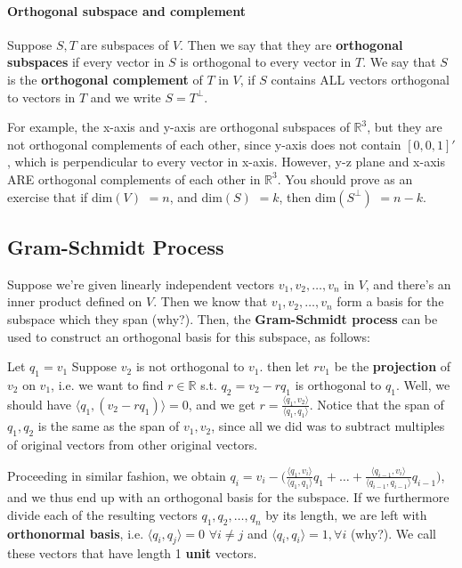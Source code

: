 \documentclass[12pt,oneside]{article}
\begin{document}
\paragraph{Orthogonal subspace and complement}
Suppose $S, T$ are subspaces of $V$. Then we say that they are \textbf{orthogonal subspaces} if every vector in $S$ is orthogonal to every vector in $T$. We say that $S$ is the \textbf{orthogonal complement} of $T$ in $V$, if $S$ contains ALL vectors orthogonal to vectors in $T$ and we write $S = T^\perp$. 

For example, the x-axis and y-axis are orthogonal subspaces of ${\mathbb{R}}^3$, but they are not orthogonal complements of each other, since y-axis does not contain $\left[ 0, 0, 1 \right]'$, which is perpendicular to every vector in x-axis. However, y-z plane and x-axis ARE orthogonal complements of each other in ${\mathbb{R}}^3$. You should prove as an exercise that if dim$(V)$ $= n$, and dim$(S)$ $=k$, then dim$(S^\perp)$ $= n-k$.

\subsection{Gram-Schmidt Process}

Suppose we're given linearly independent vectors $v_{1}, v_{2}, \ldots, v_{n}$ in $V$, and there's an inner product defined on $V$. Then we know that $v_1, v_2, \ldots, v_n$ form a basis for the subspace which they span (why?).  Then, the \textbf{Gram-Schmidt process} can be used to construct an orthogonal basis for this subspace, as follows:

Let $q_1 = v_1$ Suppose $v_2$ is not orthogonal to $v_1$. then let $r v_1$ be the \textbf{projection} of $v_2$ on $v_1$, i.e. we want to find $r \in \mathbb{R}$ s.t. $q_2 = v_2 - r q_1$ is orthogonal to $q_1$. Well, we should have $\langle q_1, (v_2 - r q_1) \rangle = 0$, and we get $r = \frac{\langle q_1, v_2 \rangle}{\langle q_1, q_1 \rangle}$. Notice that the span of $q_1, q_2$ is the same as the span of $v_1, v_2$, since all we did was to subtract multiples of original vectors from other original vectors. 

Proceeding in similar fashion, we obtain $q_i = v_i - \Big( \frac{\langle q_1, v_i \rangle}{\langle q_1, q_1 \rangle} q_1 + \ldots + \frac{\langle q_{i-1}, v_{i} \rangle}{\langle q_{i-1}, q_{i-1} \rangle} q_{i-1}\Big)$, and we thus end up with an orthogonal basis for the subspace. If we furthermore divide each of the resulting vectors $q_1, q_2, \ldots, q_n$ by its length, we are left with \textbf{orthonormal basis}, i.e. $\langle q_i, q_j \rangle = 0$ $\forall i \neq j$ and $\langle q_i, q_i \rangle = 1, \forall i$ (why?). We call these vectors that have length 1 \textbf{unit} vectors.
\end{document}
